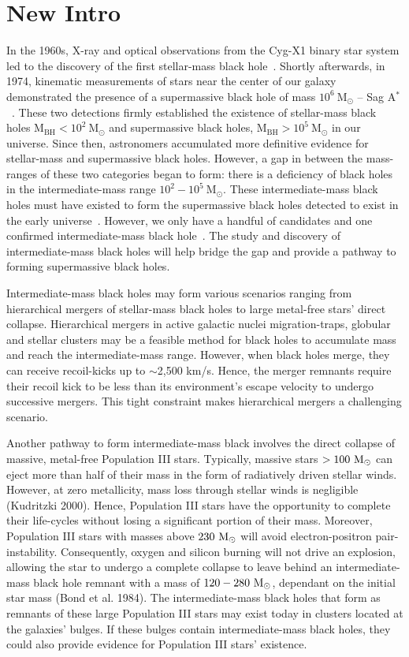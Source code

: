 \documentclass[%
 nofootinbib,
 amsmath,amssymb,
 aps,
 twocolumn
]{revtex4-2}
\newcommand{\mathcmd}[1]{{\sc \relax\ifmmode#1\else $#1$\fi}\xspace}
\newcommand{\msun}{\mathcmd{\text{M}_\odot}}
\begin{document}
\section{New Intro}
In the 1960s, X-ray and optical observations from the Cyg-X1 binary star system led to the discovery of the first stellar-mass black hole~\cite{}. Shortly afterwards, in 1974, kinematic measurements of stars near the center of our galaxy demonstrated the presence of a supermassive black hole of mass $10^6\ \text{M}_{\odot}$ -- Sag A$^*$~\cite{}. These two detections firmly established the existence of stellar-mass
black holes $\text{M}_\text{BH} < 10^{2} \ \text{M}_{\odot}$ and
supermassive black holes, $\text{M}_\text{BH} > 10^{5} \ \text{M}_{\odot}$ in our universe. Since then, astronomers accumulated more definitive evidence for stellar-mass and supermassive black holes. However, a gap in between the mass-ranges of these two categories began to form: there is a deficiency of black holes in the intermediate-mass range $10^{2} - 10^{5}\ \text{M}_{\odot}$. These intermediate-mass black holes must have existed to form the supermassive black holes detected to exist in the early universe~\cite{}. However, we only have a handful of candidates and one confirmed intermediate-mass black hole~\cite{}. The study and discovery of intermediate-mass black holes will help bridge the gap and provide a pathway to forming supermassive black holes. 

Intermediate-mass black holes may form various scenarios ranging from hierarchical mergers of stellar-mass black holes to large metal-free stars' direct collapse. Hierarchical mergers in active galactic nuclei migration-traps, globular and stellar clusters may be a feasible method for black holes to accumulate mass and reach the intermediate-mass range. However, when black holes merge, they can receive recoil-kicks up to $\sim$2,500 km/s. Hence, the merger remnants require their recoil kick to be less than its environment's escape velocity to undergo successive mergers. This tight constraint makes hierarchical mergers a challenging scenario. 

Another pathway to form intermediate-mass black involves the direct collapse of massive, metal-free Population III stars. Typically, massive stars $> 100 \ \msun$ can eject more than half of their mass in the form of radiatively driven stellar winds. However, at zero metallicity, mass loss through stellar winds is negligible (Kudritzki 2000). Hence,  Population III stars have the opportunity to complete their life-cycles without losing a significant portion of their mass. Moreover, Population III stars with masses above $230 \ \msun$ will avoid electron-positron pair-instability. Consequently, oxygen and silicon burning will not drive an explosion, allowing the star to undergo a complete collapse to leave behind an intermediate-mass black hole remnant with a mass of $120-280 \ \msun$, dependant on the initial star mass (Bond et al. 1984). The intermediate-mass black holes that form as remnants of these large Population III stars may exist today in clusters located at the galaxies' bulges. If these bulges contain intermediate-mass black holes, they could also provide evidence for Population III stars' existence. 
\end{document}
